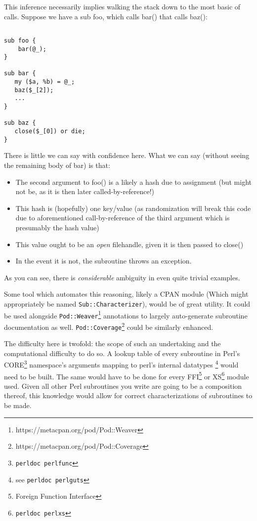 \documentclass{article}
\begin{document}
This inference necessarily implies walking the stack down to the most basic of calls.
Suppose we have a sub foo, which calls bar() that calls baz():

\begin{lstlisting}

sub foo {
    bar(@_);
}

sub bar {
   my ($a, %b) = @_;
   baz($_[2]);
   ...
}

sub baz {
   close($_[0]) or die;
}

\end{lstlisting}

There is little we can say with confidence here.
What we can say (without seeing the remaining body of bar) is that:
\begin{itemize}
\item The second argument to foo() is a likely a hash due to assignment (but might not be, as it is then later called-by-reference!)
\item This hash is (hopefully) one key/value (as randomization will break this code due to aforementioned call-by-reference of the third argument which is presumably the hash value)
\item This value ought to be an \textit{open} filehandle, given it is then passed to close()
\item In the event it is not, the subroutine throws an exception.
\end{itemize}
As you can see, there is \textit{considerable} ambiguity in even quite trivial examples.

Some tool which automates this reasoning, likely a CPAN module (Which might appropriately be named \texttt{Sub::Characterizer}), would be of great utility.
It could be used alongside \texttt{Pod::Weaver}\footnote{https://metacpan.org/pod/Pod::Weaver} annotations to largely auto-generate subroutine documentation as well.
\texttt{Pod::Coverage}\footnote{https://metacpan.org/pod/Pod::Coverage} could be similarly enhanced.

The difficulty here is twofold: the scope of such an undertaking and the computational difficulty to do so.
A lookup table of every subroutine in Perl's CORE\footnote{\texttt{perldoc perlfunc}} namespace's arguments mapping to perl's internal datatypes \footnote{see \texttt{perldoc perlguts}} would need to be built.
The same would have to be done for every FFI\footnote{Foreign Function Interface} or XS\footnote{\texttt{perldoc perlxs}} module used.
Given all other Perl subroutines you write are going to be a composition thereof, this knowledge would allow for correct characterizations of subroutines to be made.
\end{document}
